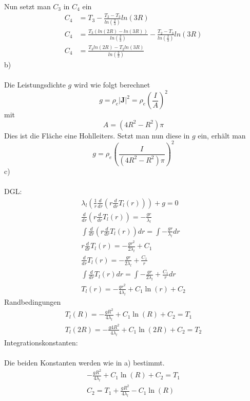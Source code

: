 Nun setzt man $C_3$ in $C_4$ ein
\begin{align*}
	C_4 &= T_3 -  \frac{T_2 - T_3}{ln\left( \frac{2}{3}\right)} ln\left( 3R\right) \\
	C_4 &= \frac{T_3 \left( ln\left( 2R\right) - ln\left( 3R\right) \right)}{ln\left( \frac{2}{3}\right)} - \frac{T_2 - T_3}{ln\left( \frac{2}{3}\right)} ln\left( 3R\right) \\
	C_4 &= \frac{T_3 ln\left( 2R \right) - T_2 ln\left( 3R\right)}{ln\left( \frac{2}{3}\right)}
\end{align*}
b) \\ \\	
Die Leistungsdichte $g$ wird wie folgt berechnet
\[
	g = \rho_e |\textbf{J}|^2 = \rho_e \left( \frac{I}{A}\right)^2
\]
mit
\[
	A = \left(4R^2 - R^2\right)\pi
\]
Dies ist die Fläche eine Hohlleiters. Setzt man nun diese in $g$ ein, erhält man
\[
	g = \rho_e \left( \frac{I}{\left(4R^2 - R^2\right)\pi}\right)^2
\]
c) \\ \\
DGL:
\begin{align*}
	\lambda_l \left( \frac{1}{r}\frac{d}{dr}\left( r\frac{d}{dr} T_l\left(r\right)\right)\right) + g = 0 \\
	\frac{d}{dr}\left( r\frac{d}{dr} T_l\left(r\right)\right) = -\frac{gr}{\lambda_l} \\
	\int \frac{d}{dr}\left( r\frac{d}{dr} T_l\left(r\right)\right) dr = \int -\frac{gr}{\lambda_l} dr \\
	 r\frac{d}{dr} T_l\left(r\right) = -\frac{gr^2}{2\lambda_l} + C_1 \\
	 \frac{d}{dr} T_l\left(r\right) = -\frac{gr}{2\lambda_l} + \frac{C_1}{r} \\
	 \int \frac{d}{dr} T_l\left(r\right) dr = \int -\frac{gr}{2\lambda_l} + \frac{C_1}{r} dr \\
	 T_l\left(r\right) = -\frac{gr^2}{4\lambda_l} + C_1\ln\left( r \right) + C_2
\end{align*}
Randbedingungen
\begin{align*}
	T_l\left(R\right) = -\frac{gR^2}{4\lambda_l} + C_1\ln\left(R\right) + C_2 = T_1 \\
	T_l\left(2R\right) = -\frac{g4R^2}{4\lambda_l} + C_1 \ln\left(2R\right) + C_2 = T_2
\end{align*}
\newpage
\noindent
Integrationskonstanten: \\ \\
Die beiden Konstanten werden wie in a) bestimmt.
\begin{align*}
	-\frac{gR^2}{4\lambda_l} + C_1\ln\left(R\right) + C_2 = T_1 \\
	C_2 = T_1 + \frac{gR^2}{4\lambda_l} - C_1\ln\left(R\right)
\end{align*}
